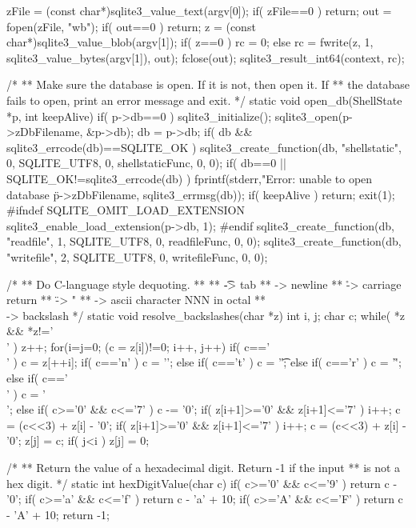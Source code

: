 \begin{Codex}[label=shell.c,numbers=left]
{{  zFile = (const char*)sqlite3_value_text(argv[0]);
  if( zFile==0 ) return;
  out = fopen(zFile, "wb");
  if( out==0 ) return;
  z = (const char*)sqlite3_value_blob(argv[1]);
  if( z==0 ){
    rc = 0;
  }else{
    rc = fwrite(z, 1, sqlite3_value_bytes(argv[1]), out);
  }
  fclose(out);
  sqlite3_result_int64(context, rc);
}

/*
** Make sure the database is open.  If it is not, then open it.  If
** the database fails to open, print an error message and exit.
*/
static void open_db(ShellState *p, int keepAlive){
  if( p->db==0 ){
    sqlite3_initialize();
    sqlite3_open(p->zDbFilename, &p->db);
    db = p->db;
    if( db && sqlite3_errcode(db)==SQLITE_OK ){
      sqlite3_create_function(db, "shellstatic", 0, SQLITE_UTF8, 0,
          shellstaticFunc, 0, 0);
    }
    if( db==0 || SQLITE_OK!=sqlite3_errcode(db) ){
      fprintf(stderr,"Error: unable to open database \"%
          p->zDbFilename, sqlite3_errmsg(db));
      if( keepAlive ) return;
      exit(1);
    }
#ifndef SQLITE_OMIT_LOAD_EXTENSION
    sqlite3_enable_load_extension(p->db, 1);
#endif
    sqlite3_create_function(db, "readfile", 1, SQLITE_UTF8, 0,
                            readfileFunc, 0, 0);
    sqlite3_create_function(db, "writefile", 2, SQLITE_UTF8, 0,
                            writefileFunc, 0, 0);
  }
}

/*
** Do C-language style dequoting.
**
**    \t    -> tab
**    \n    -> newline
**    \r    -> carriage return
**    \"    -> "
**    \NNN  -> ascii character NNN in octal
**    \\    -> backslash
*/
static void resolve_backslashes(char *z){
  int i, j;
  char c;
  while( *z && *z!='\\' ) z++;
  for(i=j=0; (c = z[i])!=0; i++, j++){
    if( c=='\\' ){
      c = z[++i];
      if( c=='n' ){
        c = '\n';
      }else if( c=='t' ){
        c = '\t';
      }else if( c=='r' ){
        c = '\r';
      }else if( c=='\\' ){
        c = '\\';
      }else if( c>='0' && c<='7' ){
        c -= '0';
        if( z[i+1]>='0' && z[i+1]<='7' ){
          i++;
          c = (c<<3) + z[i] - '0';
          if( z[i+1]>='0' && z[i+1]<='7' ){
            i++;
            c = (c<<3) + z[i] - '0';
          }
        }
      }
    }
    z[j] = c;
  }
  if( j<i ) z[j] = 0;
}

/*
** Return the value of a hexadecimal digit.  Return -1 if the input
** is not a hex digit.
*/
static int hexDigitValue(char c){
  if( c>='0' && c<='9' ) return c - '0';
  if( c>='a' && c<='f' ) return c - 'a' + 10;
  if( c>='A' && c<='F' ) return c - 'A' + 10;
  return -1;
}

}
\end{Codex}

